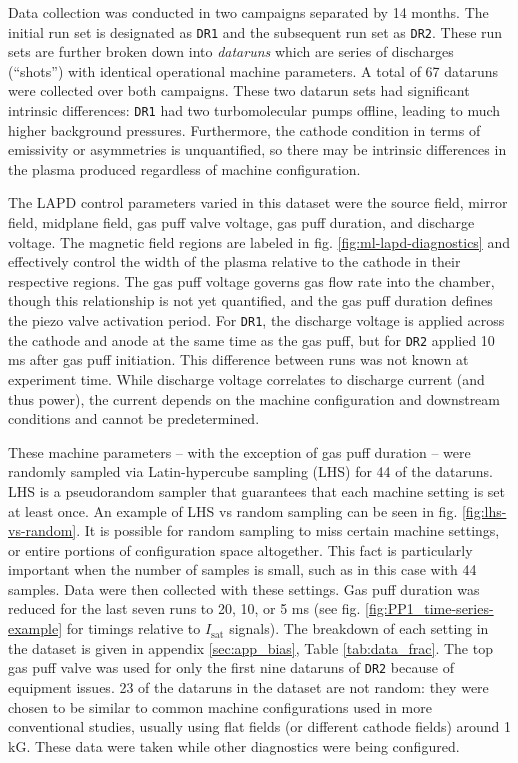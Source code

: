 Data collection was conducted in two campaigns separated by 14 months. The initial run set is designated as \texttt{DR1} and the subsequent run set as \texttt{DR2}. These run sets are further broken down into \emph{dataruns} which are series of discharges (``shots'') with identical operational machine parameters. A total of 67 dataruns were collected over both campaigns. These two datarun sets had significant intrinsic differences: \texttt{DR1} had two turbomolecular pumps offline, leading to much higher background pressures. Furthermore, the cathode condition in terms of emissivity or asymmetries is unquantified, so there may be intrinsic differences in the plasma produced regardless of machine configuration. 

The LAPD control parameters varied in this dataset were the source field, mirror field, midplane field, gas puff valve voltage, gas puff duration, and discharge voltage. The magnetic field regions are labeled in fig. \ref{fig:ml-lapd-diagnostics} and effectively control the width of the plasma relative to the cathode in their respective regions. The gas puff voltage governs gas flow rate into the chamber, though this relationship is not yet quantified, and the gas puff duration defines the piezo valve activation period. For \texttt{DR1}, the discharge voltage is applied across the cathode and anode at the same time as the gas puff, but for \texttt{DR2} applied 10 ms after gas puff initiation. This difference between runs was not known at experiment time. While discharge voltage correlates to discharge current (and thus power), the current depends on the machine configuration and downstream conditions and cannot be predetermined.

These machine parameters -- with the exception of gas puff duration -- were randomly sampled via Latin-hypercube sampling (LHS) for 44 of the dataruns. LHS is a pseudorandom sampler that guarantees that each machine setting is set at least once. An example of LHS vs random sampling can be seen in fig. \ref{fig:lhs-vs-random}. It is possible for random sampling to miss certain machine settings, or entire portions of configuration space altogether. This fact is particularly important when the number of samples is small, such as in this case with 44 samples. Data were then collected with these settings. Gas puff duration was reduced for the last seven runs to 20, 10, or 5 ms (see fig. \ref{fig:PP1_time-series-example} for timings relative to $I_\text{sat}$ signals). The breakdown of each setting in the dataset is given in appendix \ref{sec:app_bias}, Table \ref{tab:data_frac}. The top gas puff valve was used for only the first nine dataruns of \texttt{DR2} because of equipment issues. 23 of the dataruns in the dataset are not random: they were chosen to be similar to common machine configurations used in more conventional studies, usually using flat fields (or different cathode fields) around 1 kG. These data were taken while other diagnostics were being configured.

